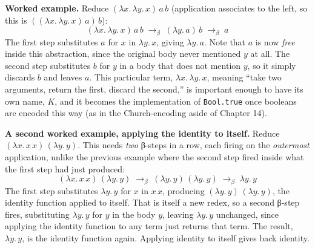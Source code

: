 \textbf{Worked example.} Reduce \((\lambda x.\, \lambda y.\, x)\, a\, b\) (application associates to the left, so this is \(((\lambda x.\, \lambda y.\, x)\, a)\, b\)): \[
(\lambda x.\, \lambda y.\, x)\, a\, b
\;\longrightarrow_\beta\; (\lambda y.\, a)\, b
\;\longrightarrow_\beta\; a
\] The first step substitutes \(a\) for \(x\) in \(\lambda y.\, x\), giving \(\lambda y.\, a\). Note that \(a\) is now \emph{free} inside this abstraction, since the original body never mentioned \(y\) at all. The second step substitutes \(b\) for \(y\) in a body that does not mention \(y\), so it simply discards \(b\) and leaves \(a\). This particular term, \(\lambda x.\, \lambda y.\, x\), meaning ``take two arguments, return the first, discard the second,'' is important enough to have its own name, \(K\), and it becomes the implementation of \texttt{Bool.true} once booleans are encoded this way (as in the Church-encoding aside of Chapter 14).

\textbf{A second worked example, applying the identity to itself.} Reduce \((\lambda x.\, x\, x)\, (\lambda y.\, y)\). This needs \emph{two} β-steps in a row, each firing on the \emph{outermost} application, unlike the previous example where the second step fired inside what the first step had just produced: \[
(\lambda x.\, x\, x)\, (\lambda y.\, y)
\;\longrightarrow_\beta\; (\lambda y.\, y)\, (\lambda y.\, y)
\;\longrightarrow_\beta\; \lambda y.\, y
\] The first step substitutes \(\lambda y.\, y\) for \(x\) in \(x\, x\), producing \((\lambda y.\, y)\, (\lambda y.\, y)\), the identity function applied to itself. That is itself a new redex, so a second β-step fires, substituting \(\lambda y.\, y\) for \(y\) in the body \(y\), leaving \(\lambda y.\, y\) unchanged, since applying the identity function to any term just returns that term. The result, \(\lambda y.\, y\), is the identity function again. Applying identity to itself gives back identity.

